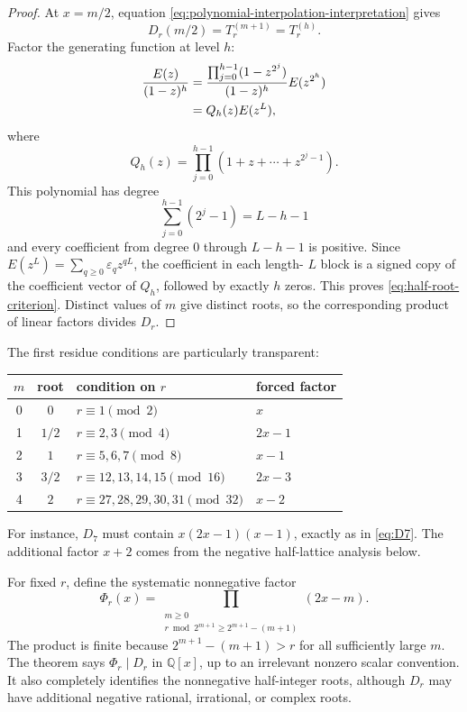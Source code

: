 \documentclass[11pt,oneside]{article}
\numberwithin{equation}{section}
\theoremstyle{definition}
\theoremstyle{remark}
\newcommand{\Q}{\mathbb Q}
\newcommand{\eps}{\varepsilon}
\newcommand{\Diag}{D}
\newcommand{\Prefix}{T}
\begin{document}
\begin{proof}
At \(x=m/2\), equation \eqref{eq:polynomial-interpolation-interpretation}
gives
\[
 \Diag_r(m/2)=\Prefix_r^{(m+1)}=\Prefix_r^{(h)}.
\]
Factor the generating function at level \(h\):
\begin{align}
 \frac{E(z)}{(1-z)^h}
 &=\frac{\prod_{j=0}^{h-1}(1-z^{2^j})}{(1-z)^h}
   E(z^{2^h})\notag\\
 &=Q_h(z)E(z^L),
 \label{eq:Qh-factorization-preview}
\end{align}
where
\begin{equation}
 Q_h(z)=\prod_{j=0}^{h-1}
 (1+z+\cdots+z^{2^j-1}).
 \label{eq:Qh-definition-preview}
\end{equation}
This polynomial has degree
\[
 \sum_{j=0}^{h-1}(2^j-1)=L-h-1
\]
and every coefficient from degree \(0\) through \(L-h-1\) is positive.
Since \(E(z^L)=\sum_{q\ge0}\eps_qz^{qL}\), the coefficient in each length-
\(L\) block is a signed copy of the coefficient vector of \(Q_h\), followed by
exactly \(h\) zeros.  This proves \eqref{eq:half-root-criterion}.  Distinct
values of \(m\) give distinct roots, so the corresponding product of linear
factors divides \(\Diag_r\).
\end{proof}

The first residue conditions are particularly transparent:
\begin{center}
\begin{tabular}{ccll}
\toprule
\(m\) & root & condition on \(r\) & forced factor \\
\midrule
0 & \(0\) & \(r\equiv1\pmod2\) & \(x\) \\
1 & \(1/2\) & \(r\equiv2,3\pmod4\) & \(2x-1\) \\
2 & \(1\) & \(r\equiv5,6,7\pmod8\) & \(x-1\) \\
3 & \(3/2\) & \(r\equiv12,13,14,15\pmod{16}\) & \(2x-3\) \\
4 & \(2\) & \(r\equiv27,28,29,30,31\pmod{32}\) & \(x-2\) \\
\bottomrule
\end{tabular}
\end{center}
For instance, \(\Diag_7\) must contain \(x(2x-1)(x-1)\), exactly as in
\eqref{eq:D7}.  The additional factor \(x+2\) comes from the negative
half-lattice analysis below.

For fixed \(r\), define the systematic nonnegative factor
\begin{equation}
 \Phi_r(x)=
 \prod_{\substack{m\ge0\\
 r\bmod 2^{m+1}\ge2^{m+1}-(m+1)}}(2x-m).
 \label{eq:Phi-factor}
\end{equation}
The product is finite because \(2^{m+1}-(m+1)>r\) for all sufficiently large
\(m\).  The theorem says \(\Phi_r\mid\Diag_r\) in \(\Q[x]\), up to an
irrelevant nonzero scalar convention.  It also completely identifies the
nonnegative half-integer roots, although \(\Diag_r\) may have additional
negative rational, irrational, or complex roots.
\end{document}

